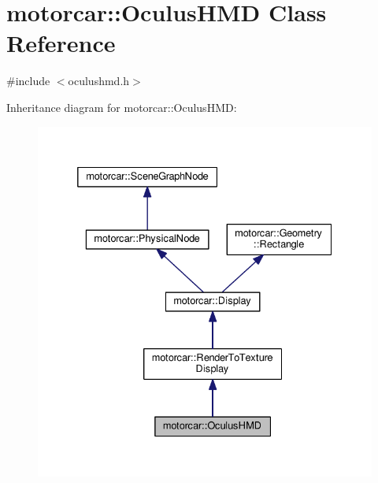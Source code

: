 \hypertarget{classmotorcar_1_1OculusHMD}{\section{motorcar\-:\-:Oculus\-H\-M\-D Class Reference}
\label{classmotorcar_1_1OculusHMD}
}


{\ttfamily \#include $<$oculushmd.\-h$>$}



Inheritance diagram for motorcar\-:\-:Oculus\-H\-M\-D\-:
\nopagebreak
\begin{figure}[H]
\begin{center}
\leavevmode
\includegraphics[width=332pt]{classmotorcar_1_1OculusHMD__inherit__graph}
\end{center}
\end{figure}


